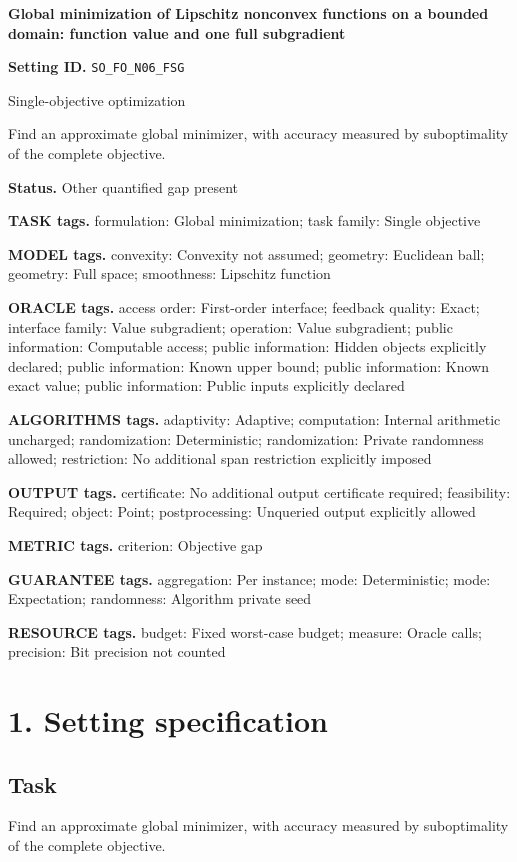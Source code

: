 \documentclass[10pt,a4paper]{article}
\begin{document}
\raggedright

{\LARGE\bfseries\sffamily\color{AtlasNavy} Global minimization of Lipschitz nonconvex functions on a bounded domain: function value and one full subgradient\par}\vspace{5pt}
\textbf{Setting ID.} \texttt{SO\_\allowbreak{}FO\_\allowbreak{}N06\_\allowbreak{}FSG}

Single-objective optimization

Find an approximate global minimizer, with accuracy measured by suboptimality of the complete objective.

\textbf{Status.} Other quantified gap present

\textbf{TASK tags.} formulation: Global minimization; task family: Single objective

\textbf{MODEL tags.} convexity: Convexity not assumed; geometry: Euclidean ball; geometry: Full space; smoothness: Lipschitz function

\textbf{ORACLE tags.} access order: First-order interface; feedback quality: Exact; interface family: Value subgradient; operation: Value subgradient; public information: Computable access; public information: Hidden objects explicitly declared; public information: Known upper bound; public information: Known exact value; public information: Public inputs explicitly declared

\textbf{ALGORITHMS tags.} adaptivity: Adaptive; computation: Internal arithmetic uncharged; randomization: Deterministic; randomization: Private randomness allowed; restriction: No additional span restriction explicitly imposed

\textbf{OUTPUT tags.} certificate: No additional output certificate required; feasibility: Required; object: Point; postprocessing: Unqueried output explicitly allowed

\textbf{METRIC tags.} criterion: Objective gap

\textbf{GUARANTEE tags.} aggregation: Per instance; mode: Deterministic; mode: Expectation; randomness: Algorithm private seed

\textbf{RESOURCE tags.} budget: Fixed worst-case budget; measure: Oracle calls; precision: Bit precision not counted

\section{1. Setting specification}
\subsection{Task}
Find an approximate global minimizer, with accuracy measured by suboptimality of the complete objective.
\end{document}
